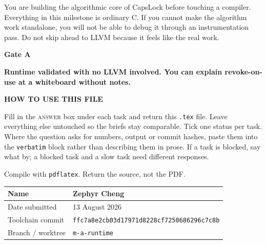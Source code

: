 \documentclass[11pt,a4paper]{article}
\begin{document}
\thispagestyle{fancy}

\par\vspace{2pt}
\par\vspace{8pt}

\begin{notebox}
You are building the algorithmic core of CapsLock before touching a compiler. Everything in this milestone is ordinary C. If you cannot make the algorithm work standalone, you will not be able to debug it through an instrumentation pass. Do not skip ahead to LLVM because it feels like the real work.
\end{notebox}

\begin{gatebox}
{\scriptsize\bfseries\color{mute}Gate A}\par\vspace{2pt}
{\bfseries Runtime validated with no LLVM involved. You can explain revoke-on-use at a whiteboard without notes.}
\end{gatebox}

\begin{notebox}
{\scriptsize\bfseries\color{mute}HOW TO USE THIS FILE}\par\vspace{3pt}
Fill in the \textsc{answer} box under each task and return this \texttt{.tex} file. Leave everything
else untouched so the briefs stay comparable. Tick one status per task. Where the question asks for
numbers, output or commit hashes, paste them into the \texttt{verbatim} block rather than describing
them in prose. If a task is blocked, say what by; a blocked task and a slow task need different
responses.\par\vspace{4pt}
{\scriptsize\color{mute}Compile with \texttt{pdflatex}. Return the source, not the PDF.}
\end{notebox}

\vspace{4pt}
\noindent\begin{tabular}{@{}p{34mm}p{120mm}@{}}
\hline
{\footnotesize\color{mute}Name} & \rule{0pt}{4.4mm}Zephyr Cheng \\
\hline
{\footnotesize\color{mute}Date submitted} & \rule{0pt}{4.4mm}13 August 2026 \\
\hline
{\footnotesize\color{mute}Toolchain commit} & \rule{0pt}{4.4mm}\texttt{ffc7a8e2cb03d17971d8228cf7250686296c7c8b} \\
\hline
{\footnotesize\color{mute}Branch / worktree} & \rule{0pt}{4.4mm}\texttt{m-a-runtime} \\
\hline
\end{tabular}
\end{document}
